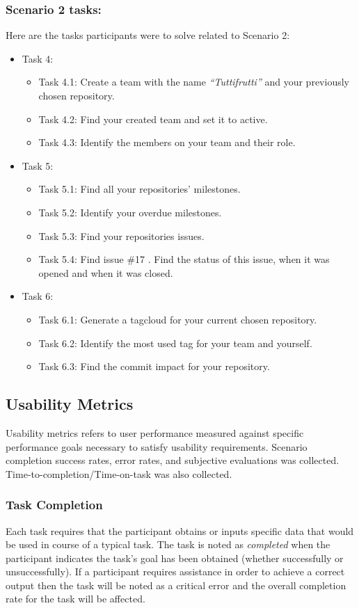 \subsubsection{Scenario 2 tasks:}
Here are the tasks participants were to solve related to Scenario 2:
\begin{itemize}
\item Task 4:
	\begin{itemize}
		\item Task 4.1: Create a team with the name \emph{“Tuttifrutti”} and your previously chosen repository.
		\item Task 4.2: Find your created team and set it to active.
		\item Task 4.3: Identify the members on your team and their role.
	\end{itemize}
\item Task 5:
	\begin{itemize}
		\item Task 5.1: Find all your repositories’ milestones.
		\item Task 5.2: Identify your overdue milestones.
		\item Task 5.3: Find your repositories issues.
		\item Task 5.4: Find issue \#17 . Find the status of this issue, when it was opened and when it was closed.
	\end{itemize}
\item Task 6:
	\begin{itemize}
		\item Task 6.1: Generate a tagcloud for your current chosen repository.
		\item Task 6.2: Identify the most used tag for your team and yourself.
		\item Task 6.3: Find the commit impact for your repository.
	\end{itemize}
\end{itemize}

\subsection{Usability Metrics}
Usability metrics refers to user performance measured against specific performance goals necessary to satisfy usability requirements. Scenario completion success rates, error rates, and subjective evaluations was collected. Time-to-completion/Time-on-task was also collected.

\subsubsection{Task Completion}
Each task requires that the participant obtains or inputs specific data that would be used in course of a typical task. The task is noted as \emph{completed} when the participant indicates the task's goal has been obtained (whether successfully or unsuccessfully).  If a participant requires assistance in order to achieve a correct output then the task will be noted as a critical error and the overall completion rate for the task will be affected.

